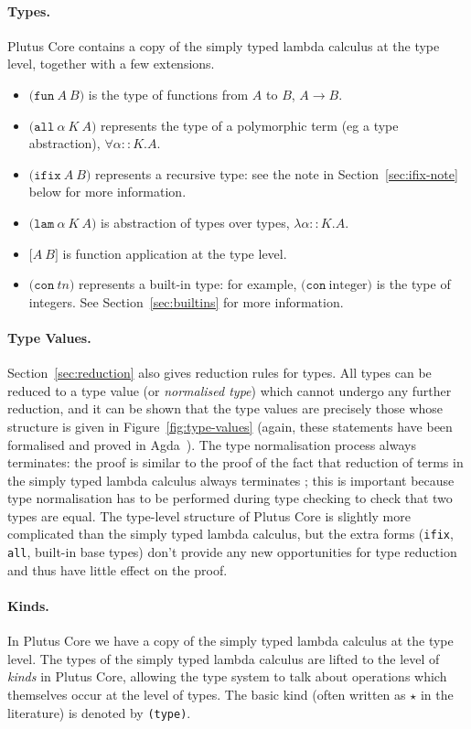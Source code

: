 \documentclass[a4paper]{article}
\newcommand{\keyword}[1]{\texttt{#1}}
\newcommand{\construct}[1]{\texttt{(} #1 \texttt{)}}
\newcommand{\funT}[2]{\construct{\keyword{fun} ~ #1 ~ #2}}
\newcommand{\ifixT}[2]{\construct{\keyword{ifix} ~ #1 ~ #2}}
\newcommand{\fixT}{\ifixT}
\newcommand{\allT}[3]{\construct{\keyword{all} ~ #1 ~ #2 ~ #3}}
\newcommand{\conT}[1]{\construct{\keyword{con} ~ #1}}
\newcommand{\lamT}[3]{\construct{\keyword{lam} ~ #1 ~ #2 ~ #3}}
\newcommand{\appT}[2]{\texttt{[} #1 ~ #2 \texttt{]}}
\begin{document}
\paragraph{Types.} Plutus Core contains a copy of the simply typed lambda calculus
  at the type level, together with a few extensions.
\begin{itemize}
\item $\funT{A}{B}$ is the type of functions from $A$ to $B$, $A \rightarrow B$.
\item $\allT{\alpha}{K}{A}$ represents the type of a polymorphic term (eg a type abstraction), $\forall \alpha{::}K.A$.
\item $\fixT{A}{B}$ represents a recursive type: see the note in Section~\ref{sec:ifix-note} below for more information.
\item $\lamT{\alpha}{K}{A}$ is abstraction of types over types, $\lambda \alpha{::}K.A$.
\item $\appT{A}{B}$ is function application at the type level.
\item $\conT{tn}$ represents a built-in type: for example, $\conT{\textrm{integer}}$
is the type of integers.  See Section~\ref{sec:builtins} for more information.
\end{itemize}


\paragraph{Type Values.} Section~\ref{sec:reduction} also gives
reduction rules for types.  All types can be reduced to a type value
(or \textit{normalised type}) which cannot undergo any further
reduction, and it can be shown that the type values are precisely
those whose structure is given in Figure~\ref{fig:type-values} (again,
these statements have been formalised and proved in
Agda~\citep{Agda}).  The type normalisation process always terminates:
the proof is similar to the proof of the fact that reduction of terms
in the simply typed lambda calculus always
terminates \citep[\S12]{Pierce:TAPL}; this is important because type
normalisation has to be performed during type checking to check that
two types are equal. The type-level structure of Plutus Core is
slightly more complicated than the simply typed lambda calculus, but
the extra forms (\texttt{ifix}, \texttt{all}, built-in base types)
don't provide any new opportunities for type reduction and thus have
little effect on the proof.

\paragraph{Kinds.} In Plutus Core we have a copy of the
simply typed lambda calculus at the type level. The types of the
simply typed lambda calculus are lifted to the level of
\textit{kinds} in Plutus Core, allowing the type system to talk about
operations which themselves occur at the level of types.  The basic
kind (often written as $\star$ in the literature) is denoted
by \texttt{(type)}.
\end{document}
